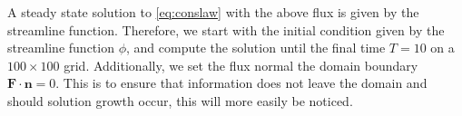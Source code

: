 A steady state solution to \eqref{eq:conslaw} with the above flux is given by the streamline function.  Therefore, we start with the initial condition given by the streamline function $\phi$, and compute the solution until the final time $T = 10$ on a $100 \times 100$ grid.  Additionally, we set the flux normal the domain boundary $\mathbf{F}\cdot \mathbf{n} = 0$.  This is to ensure that information does not leave the domain and should solution growth occur, this will more easily be noticed.



\begin{table}[h]
    \centering
    \quad
{}
    
\caption{Errors for overlapping neighborhoods study.} \label{tab:overlappingerrors}
\end{table}

